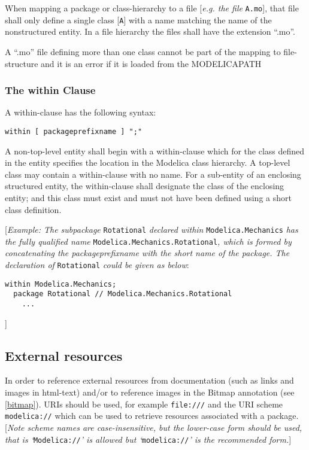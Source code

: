When mapping a package or class-hierarchy to a file {[}\emph{e.g. the
  file} \lstinline[basicstyle=\ttfamily]!A.mo!{]}, that file shall only define a single class {[}\lstinline[basicstyle=\ttfamily]!A!{]} with a
name matching the name of the nonstructured entity. In a file hierarchy
the files shall have the extension ``.mo''.

A ``.mo'' file defining more than one class cannot be part of the mapping
to file-structure and it is an error if it is loaded from the
MODELICAPATH

\subsubsection{The within Clause}

A within-clause has the following syntax:

\begin{lstlisting}[language=grammar]
  within [ packageprefixname ] ";"
\end{lstlisting}
  A non-top-level entity shall begin with a within-clause which for the
  class defined in the entity specifies the location in the Modelica class
    hierarchy. A top-level class may contain a within-clause with no name.
    For a sub-entity of an enclosing structured entity, the within-clause
shall designate the class of the enclosing entity; and this class must
exist and must not have been defined using a short class definition.

{[}\emph{Example: The subpackage} \lstinline[basicstyle=\ttfamily]!Rotational! \emph{declared within}
\lstinline[basicstyle=\ttfamily]!Modelica.Mechanics! \emph{has the fully qualified name}
\lstinline[basicstyle=\ttfamily]!Modelica.Mechanics.Rotational!\emph{, which is formed by concatenating
the packageprefixname with the short name of the package. The
declaration of} \lstinline[basicstyle=\ttfamily]!Rotational! \emph{could be given as below}:

\begin{lstlisting}[language=modelica]
  within Modelica.Mechanics;
  package Rotational // Modelica.Mechanics.Rotational
    ...
\end{lstlisting}
{]}

\subsection{External resources}

In order to reference external resources from documentation (such as
links and images in html-text) and/or to reference images in the Bitmap
annotation (see \autoref{bitmap}). URIs should be used, for example
\lstinline[basicstyle=\ttfamily]!file:///! and the URI scheme \lstinline[basicstyle=\ttfamily]!modelica://! which can be used to retrieve
resources associated with a package. {[}\emph{Note scheme names are
case-insensitive, but the lower-case form should be used, that is
`}\lstinline[basicstyle=\ttfamily]!Modelica://!\emph{' is allowed but `}\lstinline[basicstyle=\ttfamily]!modelica://!\emph{' is the
recommended form.}{]}

